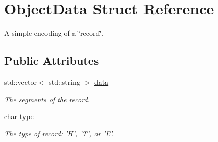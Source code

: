\hypertarget{structObjectData}{
\section{ObjectData Struct Reference}
\label{structObjectData}
}


A simple encoding of a \char`\"{}record\char`\"{}.  


\subsection*{Public Attributes}
\begin{DoxyCompactItemize}
\item 
\hypertarget{structObjectData_af755ea276bafd67e377e869950c1eb48}{
std::vector$<$ std::string $>$ \hyperlink{structObjectData_af755ea276bafd67e377e869950c1eb48}{data}}
\label{structObjectData_af755ea276bafd67e377e869950c1eb48}

\begin{DoxyCompactList}\small\item\em The segments of the record. \item\end{DoxyCompactList}\item 
\hypertarget{structObjectData_a77f1a74deb864606b1b5cc115c2a99a5}{
char \hyperlink{structObjectData_a77f1a74deb864606b1b5cc115c2a99a5}{type}}
\label{structObjectData_a77f1a74deb864606b1b5cc115c2a99a5}

\begin{DoxyCompactList}\small\item\em The type of record: 'H', 'T', or 'E'. \item\end{DoxyCompactList}\end{DoxyCompactItemize}


